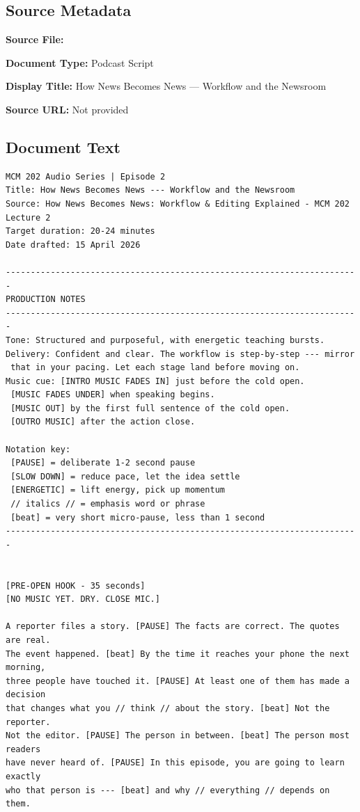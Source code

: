 \subsection*{Source Metadata}
\noindent\textbf{Source File:} \par
\noindent\textbf{Document Type:} Podcast Script\par
\noindent\textbf{Display Title:} How News Becomes News --- Workflow and the Newsroom\par
\noindent\textbf{Source URL:} Not provided\par

\subsection*{Document Text}
{\small
\begin{Verbatim}
MCM 202 Audio Series | Episode 2
Title: How News Becomes News --- Workflow and the Newsroom
Source: How News Becomes News: Workflow & Editing Explained - MCM 202 Lecture 2
Target duration: 20-24 minutes
Date drafted: 15 April 2026

-----------------------------------------------------------------------
PRODUCTION NOTES
-----------------------------------------------------------------------
Tone: Structured and purposeful, with energetic teaching bursts.
Delivery: Confident and clear. The workflow is step-by-step --- mirror
 that in your pacing. Let each stage land before moving on.
Music cue: [INTRO MUSIC FADES IN] just before the cold open.
 [MUSIC FADES UNDER] when speaking begins.
 [MUSIC OUT] by the first full sentence of the cold open.
 [OUTRO MUSIC] after the action close.

Notation key:
 [PAUSE] = deliberate 1-2 second pause
 [SLOW DOWN] = reduce pace, let the idea settle
 [ENERGETIC] = lift energy, pick up momentum
 // italics // = emphasis word or phrase
 [beat] = very short micro-pause, less than 1 second
-----------------------------------------------------------------------


[PRE-OPEN HOOK - 35 seconds]
[NO MUSIC YET. DRY. CLOSE MIC.]

A reporter files a story. [PAUSE] The facts are correct. The quotes are real.
The event happened. [beat] By the time it reaches your phone the next morning,
three people have touched it. [PAUSE] At least one of them has made a decision
that changes what you // think // about the story. [beat] Not the reporter.
Not the editor. [PAUSE] The person in between. [beat] The person most readers
have never heard of. [PAUSE] In this episode, you are going to learn exactly
who that person is --- [beat] and why // everything // depends on them.


\end{Verbatim}}
